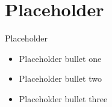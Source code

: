 \section{Placeholder}

\begin{frame}{Placeholder}
  \begin{itemize}
    \item Placeholder bullet one
    \item Placeholder bullet two
    \item Placeholder bullet three
  \end{itemize}
\end{frame}
